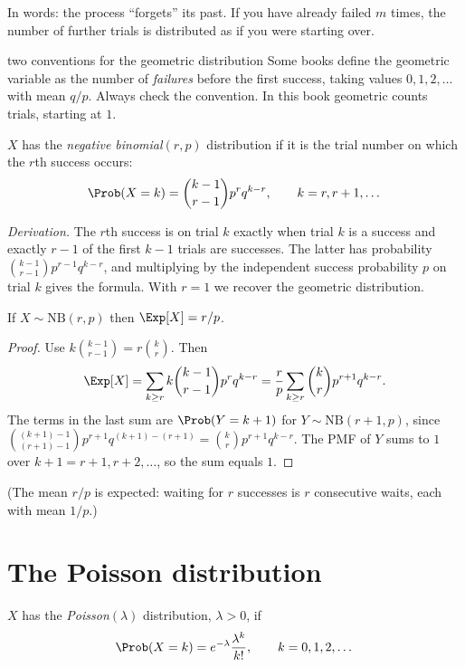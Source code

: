 In words: the process ``forgets'' its past. If you have already failed $m$ times,
the number of further trials is distributed as if you were starting over.

\begin{nuance}{two conventions for the geometric distribution}
Some books define the geometric variable as the number of \emph{failures} before
the first success, taking values $0,1,2,\dots$ with mean $q/p$. Always check the
convention. In this book geometric counts trials, starting at $1$.
\end{nuance}

\begin{definition}
$X$ has the \emph{negative binomial}$(r,p)$ distribution if it is the trial number
on which the $r$th success occurs:
\[
\Prob(X=k)=\binom{k-1}{r-1}p^rq^{k-r},\qquad k=r,r+1,\dots
\]
\end{definition}

\emph{Derivation.} The $r$th success is on trial $k$ exactly when trial $k$ is a
success and exactly $r-1$ of the first $k-1$ trials are successes. The latter
has probability $\binom{k-1}{r-1}p^{r-1}q^{k-r}$, and multiplying by the
independent success probability $p$ on trial $k$ gives the formula. With $r=1$ we
recover the geometric distribution.

\begin{theorem}\label{thm:nbmean}
If $X\sim\mathrm{NB}(r,p)$ then $\Exp[X]=r/p$.
\end{theorem}
\begin{proof}
Use $k\binom{k-1}{r-1}=r\binom kr$. Then
\[
\Exp[X]=\sum_{k\ge r}k\binom{k-1}{r-1}p^rq^{k-r}
=\frac rp\sum_{k\ge r}\binom kr p^{r+1}q^{k-r}.
\]
The terms in the last sum are $\Prob(Y=k+1)$ for $Y\sim\mathrm{NB}(r+1,p)$, since
$\binom{(k+1)-1}{(r+1)-1}p^{r+1}q^{(k+1)-(r+1)}=\binom kr p^{r+1}q^{k-r}$. The
PMF of $Y$ sums to $1$ over $k+1=r+1,r+2,\dots$, so the sum equals $1$.
\end{proof}

(The mean $r/p$ is expected: waiting for $r$ successes is $r$ consecutive waits,
each with mean $1/p$.)

\section{The Poisson distribution}

\begin{definition}[Poisson]
$X$ has the \emph{Poisson}$(\lambda)$ distribution, $\lambda>0$, if
\[
\Prob(X=k)=e^{-\lambda}\frac{\lambda^k}{k!},\qquad k=0,1,2,\dots
\]
\end{definition}

